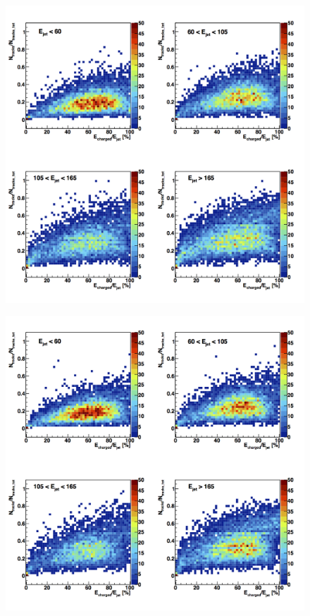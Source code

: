 \documentclass[a4paper,12pt]{article}
\begin{document}
\noindent
\begin{minipage}{\linewidth}
\centering
\begin{minipage}{0.4\linewidth}
\begin{figure}[H]
    \includegraphics[width=\linewidth]{Correlation_Ntrack_FracEchajet_full.png}
\end{figure}
\end{minipage}
      \hspace{0.05\linewidth}
      \begin{minipage}{0.4\linewidth}
\begin{figure}[H]
    \includegraphics[width=\linewidth]{Correlation_Ntrack_FracEchajet_sgv.png}

\end{figure}
\end{minipage}
\end{minipage}
\end{document}
